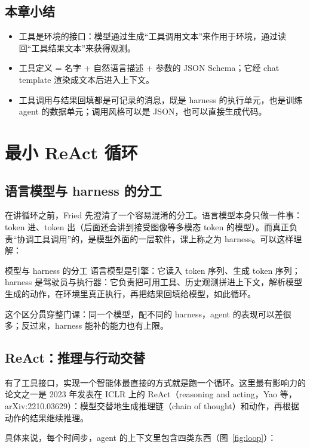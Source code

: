 \documentclass[a4paper]{article}
\begin{document}
\subsection{本章小结}

\begin{itemize}
\item 工具是环境的接口：模型通过生成“工具调用文本”来作用于环境，通过读回“工具结果文本”来获得观测。
\item 工具定义 = 名字 + 自然语言描述 + 参数的 JSON Schema；它经 chat template 渲染成文本后进入上下文。
\item 工具调用与结果回填都是可记录的消息，既是 harness 的执行单元，也是训练 agent 的数据单元；调用风格可以是 JSON，也可以直接生成代码。
\end{itemize}

\section{最小 ReAct 循环}

\subsection{语言模型与 harness 的分工}

在讲循环之前，Fried 先澄清了一个容易混淆的分工。语言模型本身只做一件事：token 进、token 出（后面还会讲到接受图像等多模态 token 的模型）。而真正负责“协调工具调用”的，是模型外面的一层软件，课上称之为 harness。可以这样理解：

\begin{importantbox}{模型与 harness 的分工}
语言模型是引擎：它读入 token 序列、生成 token 序列；harness 是驾驶员与执行器：它负责把可用工具、历史观测拼进上下文，解析模型生成的动作，在环境里真正执行，再把结果回填给模型，如此循环。
\end{importantbox}

这个区分贯穿整门课：同一个模型，配不同的 harness，agent 的表现可以差很多；反过来，harness 能补的能力也有上限。

\subsection{ReAct：推理与行动交替}

有了工具接口，实现一个智能体最直接的方式就是跑一个循环。这里最有影响力的论文之一是 2023 年发表在 ICLR 上的 ReAct（reasoning and acting，Yao 等，arXiv:2210.03629）：模型交替地生成推理链（chain of thought）和动作，再根据动作的结果继续推理。

具体来说，每个时间步，agent 的上下文里包含四类东西（图~\ref{fig:loop}）：
\end{document}
